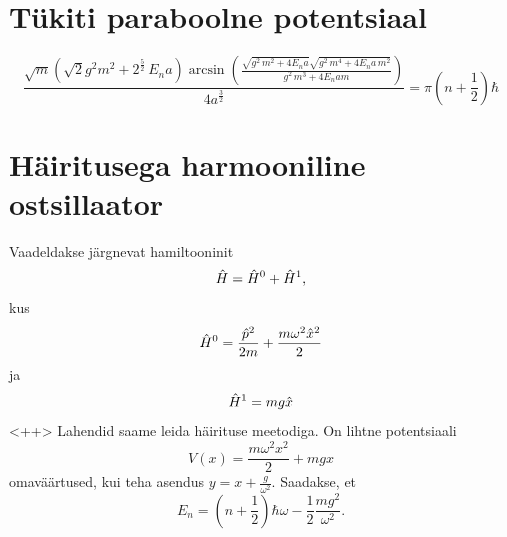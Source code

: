 \documentclass{trkut}%
\begin{document}
\section{Tükiti paraboolne potentsiaal}

\begin{equation}
    \frac{\sqrt{m} \left( \sqrt{2} {g}^{2} m^2 + {{2}^{\frac{5}{2}}}\, {E_n} a\right)  \arcsin\left( \frac{\sqrt{{{g}^{2}}\, {{m}^{2}}+4 {E_n} a} \sqrt{{{g}^{2}}\, {{m}^{4}}+4 {E_n} a\, {{m}^{2}}}}{{{g}^{2}}\, {{m}^{3}}+4 {E_n} a m}\right) }{4 {{a}^{\frac{3}{2}}}}=\ensuremath{\pi}  \left( n+\frac{1}{2}\right)  \hbar
\end{equation}

\section{Häiritusega harmooniline ostsillaator}
Vaadeldakse järgnevat hamiltooninit
\begin{equation}
    \op{H}=\op[0]{H}+\op[1]{H},
\end{equation}
kus
\begin{equation}
    \op[0]{H}=\frac{\op{p}^2}{2m}+\frac{m\omega^2 \op{x}^2}{2}
\end{equation}
ja
\begin{equation}
    \op[1]{H}=mg\op{x}
\end{equation}
<++>
Lahendid saame leida häirituse meetodiga. On lihtne potentsiaali
\begin{equation}
    V(x)=\frac{m\omega^2 x^2}{2}+mgx
\end{equation}
omaväärtused, kui teha asendus \(y=x+\frac{g}{\omega^2}\). Saadakse, et
\begin{equation}
    E_n=\left(n+\frac{1}{2}\right) \hbar \omega - \frac{1}{2}\frac{mg^2}{\omega^2}.
\end{equation}


\printbibliography
\kinnitusleht

    
\end{document}
